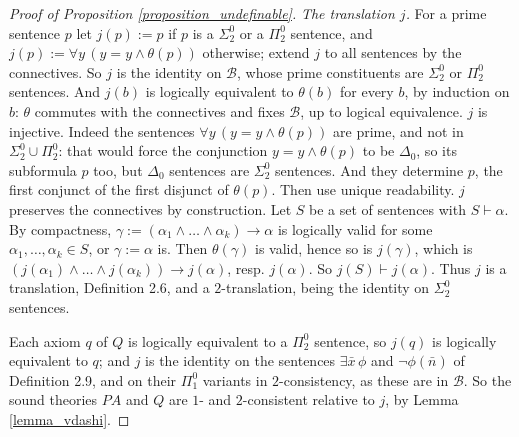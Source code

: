 \documentclass{amsart}  %
\numberwithin{equation}{section}
\theoremstyle{definition}
\theoremstyle{remark}
\begin{document}
\begin{proof} [Proof of Proposition \ref{proposition_undefinable}]
\emph{The translation $j$.} For a prime sentence $p$ let $j (p) := p$ if $p$ is a $\Sigma ^{0} _{2}$ or a $\Pi ^{0} _{2}$ sentence, and $j (p) := \forall y \, (y = y \land \theta (p))$ otherwise; extend $j$ to all sentences by the connectives. So $j$ is the identity on $\mathcal{B}$, whose prime constituents are $\Sigma ^{0} _{2}$ or $\Pi ^{0} _{2}$ sentences. And $j (b)$ is logically equivalent to $\theta (b)$ for every $b$, by induction on $b$: $\theta$ commutes with the connectives and fixes $\mathcal{B}$, up to logical equivalence. $j$ is injective. Indeed the sentences $\forall y \, (y = y \land \theta (p))$ are prime, and not in $\Sigma ^{0} _{2} \cup \Pi ^{0} _{2}$: that would force the conjunction $y = y \land \theta (p)$ to be $\Delta _{0}$, so its subformula $p$ too, but $\Delta _{0}$ sentences are $\Sigma ^{0} _{2}$ sentences. And they determine $p$, the first conjunct of the first disjunct of $\theta (p)$. Then use unique readability. $j$ preserves the connectives by construction. Let $S$ be a set of sentences with $S \vdash \alpha$. By compactness, $\gamma := (\alpha _{1} \land \ldots \land \alpha _{k}) \to \alpha$ is logically valid for some $\alpha _{1}, \ldots, \alpha _{k} \in S$, or $\gamma := \alpha$ is. Then $\theta (\gamma)$ is valid, hence so is $j (\gamma)$, which is $(j (\alpha _{1}) \land \ldots \land j (\alpha _{k})) \to j (\alpha)$, resp. $j (\alpha)$. So $j (S) \vdash j (\alpha)$. Thus $j$ is a translation, Definition 2.6, and a $2$-translation, being the identity on $\Sigma ^{0} _{2}$ sentences.

Each axiom $q$ of $Q$ is logically equivalent to a $\Pi ^{0} _{2}$ sentence, so $j (q)$ is logically equivalent to $q$; and $j$ is the identity on the sentences $\exists \bar{x} \, \phi$ and $\neg \phi (\bar{n})$ of Definition 2.9, and on their $\Pi ^{0} _{1}$ variants in $2$-consistency, as these are in $\mathcal{B}$. So the sound theories $PA$ and $Q$ are $1$- and $2$-consistent relative to $j$, by Lemma \ref{lemma_vdashi}.


\end{proof}
\end{document}
